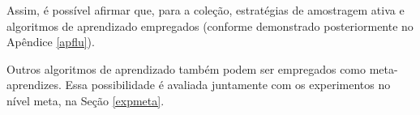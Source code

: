 Assim, é possível afirmar que, para a coleção, estratégias de amostragem ativa e algoritmos de aprendizado empregados
 (conforme demonstrado posteriormente no Apêndice \ref{apflu}).

Outros algoritmos de aprendizado também podem ser empregados como meta-aprendizes.
Essa possibilidade é avaliada juntamente com os experimentos no nível meta, na Seção \ref{expmeta}.

